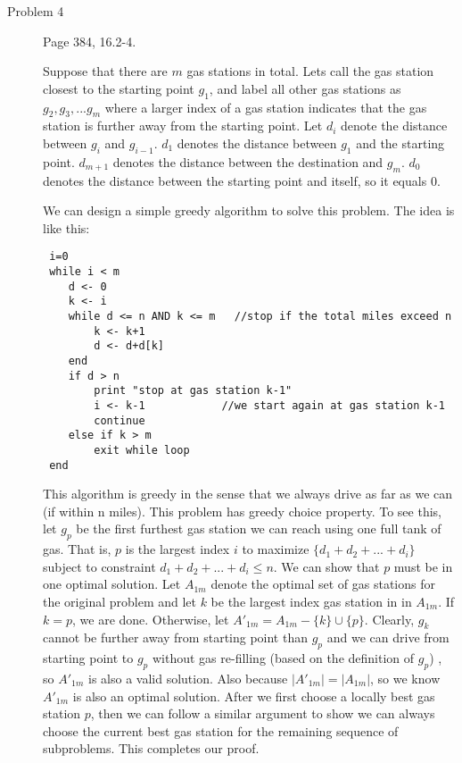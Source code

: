 \documentclass[11pt]{article}
\begin{document}
\begin{description}
\item[Problem 4] Page 384, 16.2-4.

Suppose that there are $m$ gas stations in total. Lets call the gas station closest to the starting
point $g_1$, and label all other gas stations as $g_2, g_3, ... g_m$ where a larger index of a gas
station indicates that the gas station is further away from the starting point. Let $d_i$ denote
the distance between $g_i$ and $g_{i-1}$. $d_1$ denotes the distance between $g_1$ and the starting
point. $d_{m+1}$ denotes the distance between the destination and $g_m$. $d_{0}$ denotes the
distance between the starting point and itself, so it equals $0$.


We can design a simple greedy algorithm to solve this problem. The idea is like this:
\begin{verbatim}
 i=0
 while i < m
    d <- 0
    k <- i
    while d <= n AND k <= m   //stop if the total miles exceed n
        k <- k+1
        d <- d+d[k]
    end
    if d > n
        print "stop at gas station k-1"
        i <- k-1            //we start again at gas station k-1
        continue
    else if k > m
        exit while loop
 end

\end{verbatim}

This algorithm is greedy in the sense that we always drive as far as we can (if within n miles).
This problem has greedy choice property. To see this, let $g_p$ be the first furthest gas station
we can reach using one full tank of gas. That is, $p$ is the largest index $i$ to maximize $\{d_1 +
d_2 + ... + d_i\}$ subject to constraint $d_1 + d_2 + ... + d_i\le n$. We can show that $p$ must be
in one optimal solution. Let $A_{1m}$ denote the optimal set of gas stations for the original
problem and let $k$ be the largest index gas station in in $A_{1m}$. If $k=p$, we are done.
Otherwise, let $A'_{1m}=A_{1m}-\{k\}\cup \{p\}$. Clearly, $g_k$ cannot be further away from
starting point than $g_p$ and we can drive from starting point to $g_p$ without gas re-filling
(based on the definition of $g_p$) , so $A'_{1m}$ is also a valid solution. Also because
$|A'_{1m}|=|A_{1m}|$, so we know $A'_{1m}$ is also an optimal solution. After we first choose a
locally best gas station $p$, then we can follow a similar argument to show we can always choose
the current best gas station for the remaining sequence of subproblems. This completes our proof.



\end{description}
\end{document}
